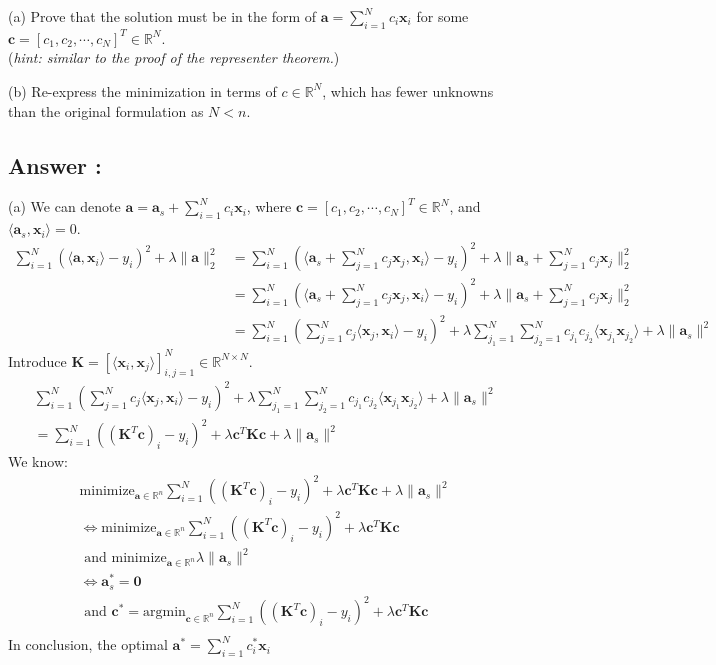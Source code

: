 \documentclass[a4paper,12pt]{article}
\newcommand{\R}{\mathbb{R}}
\begin{document}
(a) Prove that the solution must be in the form of \(\bm{a} = \sum_{i = 1}^N c_i \bm{x}_i\) for some \(\bm{c} = [c_1, c_2, \cdots, c_N]^T \in \R^N\). \\
(\textit{hint: similar to the proof of the representer theorem.})

(b) Re-express the minimization in terms of \(c \in \R^N\), which has fewer unknowns than the original formulation as \(N < n\).


\subsection*{Answer :}
(a) We can denote \(\bm{a} = \bm{a}_s + \sum_{i=1}^N c_i \bm{x}_i\), where \(\bm{c} = [c_1, c_2, \cdots, c_N]^T \in \R^N\), and \(\langle \bm{a}_s, \bm{x}_i\rangle = 0\).
\begin{align*}
    \sum_{i = 1}^N (\langle \bm{a}, \bm{x}_i\rangle - y_i)^2 + \lambda\|\bm{a}\|_2^2 &= \sum_{i = 1}^N (\langle \bm{a}_s + \sum_{j=1}^N c_j \bm{x}_j, \bm{x}_i\rangle - y_i)^2 + \lambda\| \bm{a}_s + \sum_{j=1}^N c_j \bm{x}_j\|_2^2   \\
    &= \sum_{i = 1}^N (\langle \bm{a}_s + \sum_{j=1}^N c_j \bm{x}_j, \bm{x}_i\rangle - y_i)^2 + \lambda\| \bm{a}_s + \sum_{j=1}^N c_j \bm{x}_j\|_2^2 \\
    &= \sum_{i = 1}^N ( \sum_{j=1}^N c_j \langle \bm{x}_j, \bm{x}_i\rangle - y_i)^2 + \lambda\sum_{j_1=1}^N \sum_{j_2=1}^N c_{j_1}c_{j_2} \langle \bm{x}_{j_1}\bm{x}_{j_2}\rangle + \lambda \|\bm{a}_s\|^2
\end{align*}
Introduce \(\bm{K} = [\langle \bm{x}_i, \bm{x}_j \rangle]_{i, j = 1}^N \in \R^{N \times N}\).
\begin{align*}
    &\sum_{i = 1}^N ( \sum_{j=1}^N c_j \langle \bm{x}_j, \bm{x}_i\rangle - y_i)^2 + \lambda\sum_{j_1=1}^N \sum_{j_2=1}^N c_{j_1}c_{j_2} \langle \bm{x}_{j_1}\bm{x}_{j_2}\rangle + \lambda \|\bm{a}_s\|^2 \\
    &=\sum_{i = 1}^N ((\bm{K}^T\bm{c})_i - y_i)^2 + \lambda \bm{c}^T \bm{K} \bm{c} + \lambda \|\bm{a}_s\|^2  
\end{align*}
We know:
\begin{align*}
    &\text{minimize}_{\bm{a} \in \R^n} \sum_{i = 1}^N ((\bm{K}^T\bm{c})_i - y_i)^2 + \lambda \bm{c}^T \bm{K} \bm{c} + \lambda \|\bm{a}_s\|^2   \\
    &\iff \text{minimize}_{\bm{a} \in \R^n} \sum_{i = 1}^N ((\bm{K}^T\bm{c})_i - y_i)^2 + \lambda \bm{c}^T \bm{K} \bm{c} \\ 
    &\text{ and } \text{minimize}_{\bm{a} \in \R^n} \lambda \|\bm{a}_s\|^2  \\
    &\iff \bm{a}_s^* = \bm{0} \\
    &\text{ and } \bm{c}^* = \text{argmin}_{\bm{c} \in \R^n} \sum_{i = 1}^N ((\bm{K}^T\bm{c})_i - y_i)^2 + \lambda \bm{c}^T \bm{K} \bm{c} \\ 
\end{align*}
In conclusion, the optimal \(\bm{a}^* = \sum_{i = 1}^N c_i^* \bm{x}_i\)
\end{document}
